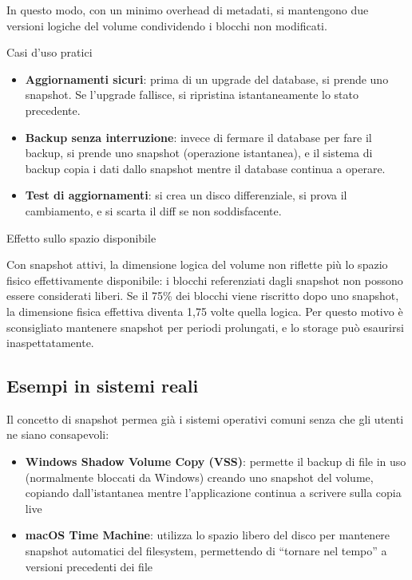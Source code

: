 \documentclass[
  italian,
  openany]{book}
\providecommand{\tightlist}{%
  \setlength{\itemsep}{0pt}\setlength{\parskip}{0pt}}
\begin{document}
In questo modo, con un minimo overhead di metadati, si mantengono due
versioni logiche del volume condividendo i blocchi non modificati.

\begin{callouttip}{Casi d’uso pratici}

\begin{itemize}
\tightlist
\item
  \textbf{Aggiornamenti sicuri}: prima di un upgrade del database, si
  prende uno snapshot. Se l'upgrade fallisce, si ripristina
  istantaneamente lo stato precedente.
\item
  \textbf{Backup senza interruzione}: invece di fermare il database per
  fare il backup, si prende uno snapshot (operazione istantanea), e il
  sistema di backup copia i dati dallo snapshot mentre il database
  continua a operare.
\item
  \textbf{Test di aggiornamenti}: si crea un disco differenziale, si
  prova il cambiamento, e si scarta il diff se non soddisfacente.
\end{itemize}

\end{callouttip}

\begin{calloutwarning}{Effetto sullo spazio disponibile}

Con snapshot attivi, la dimensione logica del volume non riflette più lo
spazio fisico effettivamente disponibile: i blocchi referenziati dagli
snapshot non possono essere considerati liberi. Se il 75\% dei blocchi
viene riscrit\-to dopo uno snapshot, la dimensione fisica effettiva
diventa 1,75 volte quella logica. Per questo motivo è sconsigliato
mantenere snapshot per periodi prolungati, e lo storage può esaurirsi
inaspettatamente.

\end{calloutwarning}

\subsection{Esempi in sistemi reali}\label{esempi-in-sistemi-reali}

Il concetto di snapshot permea già i sistemi operativi comuni senza che
gli utenti ne siano consapevoli:

\begin{itemize}
\tightlist
\item
  \textbf{Windows Shadow Volume Copy (VSS)}: permette il backup di file
  in uso (normalmente bloccati da Windows) creando uno snapshot del
  volume, copiando dall'istantanea mentre l'applicazione continua a
  scrivere sulla copia live
\item
  \textbf{macOS Time Machine}: utilizza lo spazio libero del disco per
  mantenere snapshot automatici del filesystem, permettendo di ``tornare
  nel tempo'' a versioni precedenti dei file
\end{itemize}
\end{document}
